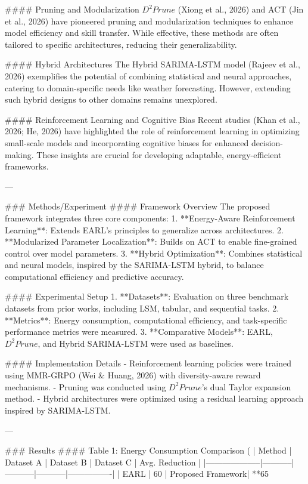 #### Pruning and Modularization  
$D^2Prune$ (Xiong et al., 2026) and ACT (Jin et al., 2026) have pioneered pruning and modularization techniques to enhance model efficiency and skill transfer. While effective, these methods are often tailored to specific architectures, reducing their generalizability.

#### Hybrid Architectures  
The Hybrid SARIMA-LSTM model (Rajeev et al., 2026) exemplifies the potential of combining statistical and neural approaches, catering to domain-specific needs like weather forecasting. However, extending such hybrid designs to other domains remains unexplored.

#### Reinforcement Learning and Cognitive Bias  
Recent studies (Khan et al., 2026; He, 2026) have highlighted the role of reinforcement learning in optimizing small-scale models and incorporating cognitive biases for enhanced decision-making. These insights are crucial for developing adaptable, energy-efficient frameworks.

---

### Methods/Experiment  
#### Framework Overview  
The proposed framework integrates three core components:  
1. **Energy-Aware Reinforcement Learning**: Extends EARL's principles to generalize across architectures.  
2. **Modularized Parameter Localization**: Builds on ACT to enable fine-grained control over model parameters.  
3. **Hybrid Optimization**: Combines statistical and neural models, inspired by the SARIMA-LSTM hybrid, to balance computational efficiency and predictive accuracy.

#### Experimental Setup  
1. **Datasets**: Evaluation on three benchmark datasets from prior works, including LSM, tabular, and sequential tasks.  
2. **Metrics**: Energy consumption, computational efficiency, and task-specific performance metrics were measured.  
3. **Comparative Models**: EARL, $D^2Prune$, and Hybrid SARIMA-LSTM were used as baselines.  

#### Implementation Details  
- Reinforcement learning policies were trained using MMR-GRPO (Wei & Huang, 2026) with diversity-aware reward mechanisms.  
- Pruning was conducted using $D^2Prune$'s dual Taylor expansion method.  
- Hybrid architectures were optimized using a residual learning approach inspired by SARIMA-LSTM.  

---

### Results  
#### Table 1: Energy Consumption Comparison (%
| Method            | Dataset A | Dataset B | Dataset C | Avg. Reduction |
|--------------------|-----------|-----------|-----------|----------------|
| EARL              | 60%
| Proposed Framework| **65%

